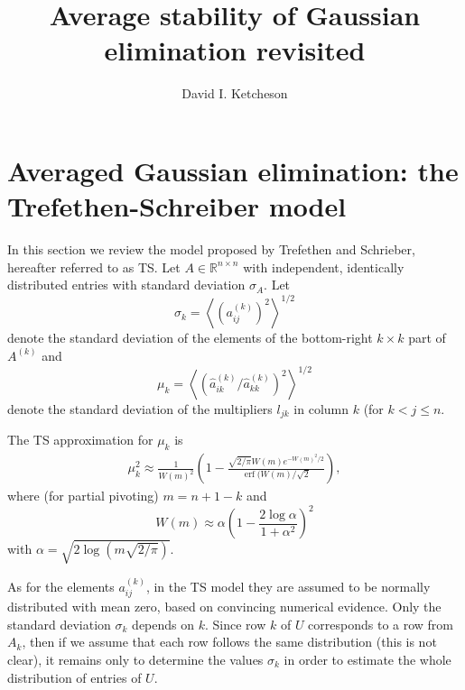 \documentclass[12pt]{article}
\title{Average stability of Gaussian elimination revisited}
\author{David I. Ketcheson}
\newcommand{\Real}{\mathbb R}
\DeclareMathOperator\erf{erf}
\begin{document}
\maketitle


\section{Averaged Gaussian elimination: the Trefethen-Schreiber model}
In this section we review the model proposed by Trefethen and Schrieber,
hereafter referred to as TS.
Let $A\in\Real^{n\times n}$ with independent, identically distributed
entries with standard deviation $\sigma_A$.  
Let 
$$\sigma_k = \left<(a_{ij}^{(k)})^2 \right>^{1/2}$$
denote the standard deviation of the elements of the bottom-right $k\times k$
part of $A^{(k)}$ and 
$$\mu_k = \left<(\hat{a}_{ik}^{(k)}/\hat{a}_{kk}^{(k)})^2 \right>^{1/2}$$
denote the standard deviation of the multipliers $l_{jk}$ in column $k$ (for $k<j\le n$.

The TS approximation for $\mu_k$ is
\begin{align}
\mu_k^2 \approx \frac{1}{W(m)^2} \left(1-\frac{\sqrt{2/\pi}W(m)e^{-W(m)^2/2}}{\erf(W(m)/\sqrt{2}}\right),
\end{align}
where (for partial pivoting) $m=n+1-k$ and
$$W(m) \approx \alpha\left(1-\frac{2\log\alpha}{1+\alpha^2}\right)^2$$
with $\alpha = \sqrt{2\log(m\sqrt{2/\pi})}$.

As for the elements $a_{ij}^{(k)}$, in the TS model they are assumed to be
normally distributed with mean zero, based on convincing numerical evidence.
Only the standard deviation $\sigma_k$ depends on $k$.  Since row $k$ of $U$
corresponds to a row from $A_k$, then if we assume that each row follows the
same distribution (this is not clear), it remains only to determine the values
$\sigma_k$ in order to estimate the whole distribution of entries of $U$.
\end{document}

